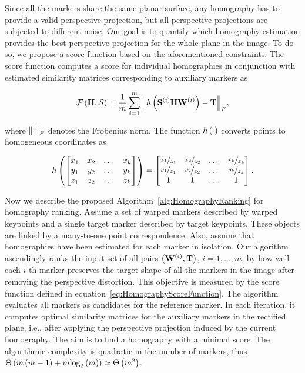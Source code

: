 Since all the markers share the same planar surface, any homography has to provide a valid perspective projection, but all perspective projections are subjected to different noise. Our goal is to quantify which homography estimation provides the best perspective projection for the whole plane in the image. To do so, we propose a score function based on the aforementioned constraints. The score function computes a score for individual homographies in conjunction with estimated similarity matrices corresponding to auxiliary markers as

\begin{equation}
    \label{eq:HomographyScoreFunction}
    {\mathcal{F}} \left( \mathbf{H}, \mathcal{S} \right) =
    \frac{1}{m}
    \sum_{i = 1}^{m}
    {\left\Vert {
        {h} \left( 
            {\mathbf{S}}^{\left( {i} \right)}
            \mathbf{H}{\mathbf{W}}^{\left( {i} \right)}
         \right)
        -
        \mathbf{T}
    } \right\Vert}_F,
\end{equation}

\noindent where ${\left\Vert {\cdot} \right\Vert}_F$ denotes the Frobenius norm. The function ${h} \left( \cdot \right)$ converts points to homogeneous coordinates as

\begin{equation}
    \label{eq:HomoCoordsConversion}
    {h} \left( 
        \begin{bmatrix}
            x_1 & x_2 & \dots & x_k \\
            y_1 & y_2 & \dots & y_k \\
            z_1 & z_2 & \dots & z_k
        \end{bmatrix}
     \right) =
    \begin{bmatrix}
        \nicefrac{x_1}{z_1} & \nicefrac{x_2}{z_2} & \dots & \nicefrac{x_k}{z_k} \\
        \nicefrac{y_1}{z_1} & \nicefrac{y_2}{z_2} & \dots & \nicefrac{y_k}{z_k} \\
        1                   & 1                   & \dots & 1
    \end{bmatrix}.
\end{equation}

Now we describe the proposed Algorithm~\ref{alg:HomographyRanking} for homography ranking. Assume a set of warped markers described by warped keypoints and a single target marker described by target keypoints. These objects are linked by a many-to-one point correspondence. Also, assume that homographies have been estimated for each marker in isolation. Our algorithm ascendingly ranks the input set of all pairs $\left( {{\mathbf{W}}^{\left( {i} \right)}, \mathbf{T}} \right)$, $i = 1, \dots, m$, by how well each $i$-th marker preserves the target shape of all the markers in the image after removing the perspective distortion. This objective is measured by the score function defined in equation~\eqref{eq:HomographyScoreFunction}. The algorithm evaluates all markers as candidates for the reference marker. In each iteration, it computes optimal similarity matrices for the auxiliary markers in the rectified plane, i.e., after applying the perspective projection induced by the current homography. The aim is to find a homography with a minimal score. The algorithmic complexity is quadratic in the number of markers, thus ${\Theta} \left( m \left( {m - 1} \right) + m {\text{log}_2} \left( m \right) \right) \simeq {\Theta} \left( m^2 \right)$.

